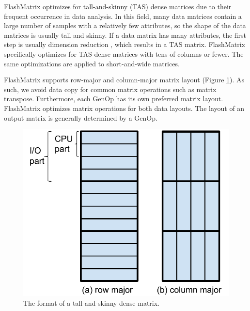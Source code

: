 FlashMatrix optimizes for tall-and-skinny (TAS) dense matrices due to their
frequent occurrence in data analysis. In this field, many data matrices contain
a large number of samples with a relatively few attributes, so the shape
of the data matrices is usually tall and skinny. If a data matrix has many
attributes, the first step is usually dimension reduction \cite{Jain00}, which
results in a TAS matrix. FlashMatrix specifically optimizes for TAS dense
matrices with tens of columns or fewer. The same optimizations are applied
to short-and-wide matrices.

FlashMatrix supports row-major and column-major matrix layout (Figure
\ref{fig:tas_mat}). As such,
we avoid data copy for common matrix operations such as matrix transpose.
Furthermore, each GenOp has its own preferred matrix layout. FlashMatrix
optimizes matrix operations for both data layouts. The layout of an output
matrix is generally determined by a GenOp.

\begin{figure}
	\centering
	\includegraphics[scale=0.5]{./dense_matrix.pdf}
	\caption{The format of a tall-and-skinny dense matrix.}
	\label{fig:tas_mat}
\end{figure}

